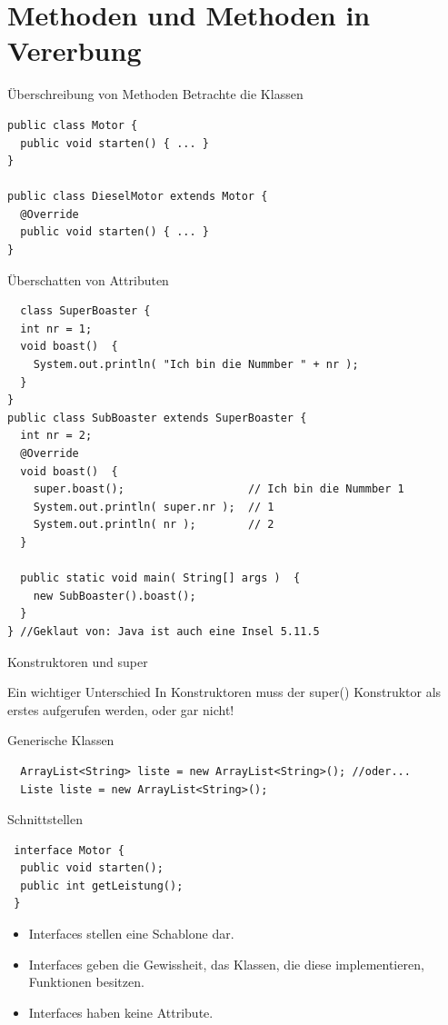 \documentclass[18pt]{beamer}
\begin{document}
\section{Methoden und Methoden in Vererbung}
\begin{frame}[fragile]{Überschreibung von Methoden}
Betrachte die Klassen
\begin{lstlisting}
public class Motor {
  public void starten() { ... }
}

public class DieselMotor extends Motor {
  @Override
  public void starten() { ... }
} 
\end{lstlisting}
\end{frame}

\begin{frame}[fragile]{Überschatten von Attributen}
 \begin{lstlisting}
  class SuperBoaster {
  int nr = 1;
  void boast()  {
    System.out.println( "Ich bin die Nummber " + nr );
  }
}
public class SubBoaster extends SuperBoaster {
  int nr = 2;
  @Override 
  void boast()  {
    super.boast();                   // Ich bin die Nummber 1
    System.out.println( super.nr );  // 1
    System.out.println( nr );        // 2
  }

  public static void main( String[] args )  {
    new SubBoaster().boast();
  }
} //Geklaut von: Java ist auch eine Insel 5.11.5
 \end{lstlisting}
\end{frame}


\begin{frame}{Konstruktoren und super}
 \begin{alertblock}{Ein wichtiger Unterschied}
  In Konstruktoren muss der super() Konstruktor als erstes aufgerufen werden,
  oder gar nicht!
 \end{alertblock}
\end{frame}


\begin{frame}[fragile]{Generische Klassen}
 \begin{lstlisting}
  ArrayList<String> liste = new ArrayList<String>(); //oder...
  Liste liste = new ArrayList<String>();
 \end{lstlisting}
\end{frame}


\begin{frame}[fragile]{Schnittstellen}
\begin{lstlisting}
 interface Motor {
  public void starten();
  public int getLeistung();
 }
 \end{lstlisting}
 \begin{itemize}
  \item Interfaces stellen eine Schablone dar.
  \item Interfaces geben die Gewissheit, das Klassen, die diese implementieren, Funktionen besitzen.
  \item Interfaces haben keine Attribute.
 \end{itemize}

\end{frame}
\end{document}
